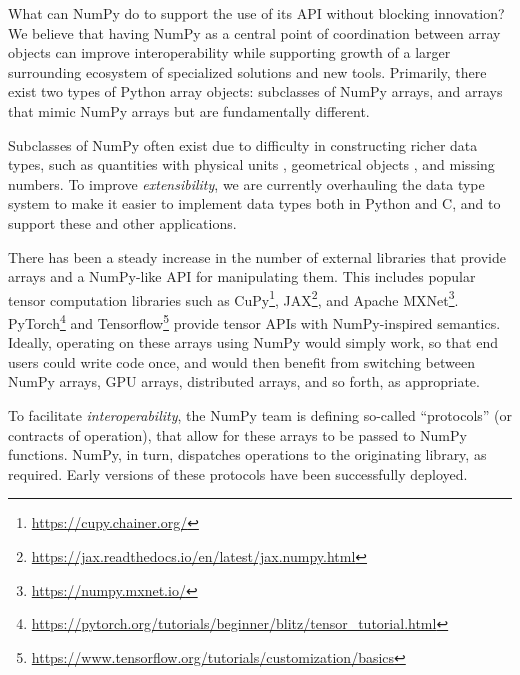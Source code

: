 What can NumPy do to support the use of its API without blocking innovation?
We believe that having NumPy as a central point of coordination between array objects can improve interoperability while
supporting growth of a larger surrounding ecosystem of specialized solutions
and new tools.
Primarily, there exist two types of Python array objects: subclasses of NumPy
arrays, and arrays that mimic NumPy arrays but are fundamentally different.

Subclasses of NumPy often exist due to difficulty in constructing richer data
types, such as quantities with physical units \cite{astropy,Goldbaum2018,pint},
geometrical objects \cite{pygeos}, and missing numbers.
To improve \emph{extensibility}, we are currently overhauling the data type
system to make it easier to implement data types both in Python and C, and to
support these and other applications.

There has been a steady increase in the number of external libraries that
provide arrays and a NumPy-like API for manipulating them.
This includes popular tensor computation libraries such as
CuPy\footnote{\url{https://cupy.chainer.org/}},
JAX\footnote{\url{https://jax.readthedocs.io/en/latest/jax.numpy.html}}, and
Apache MXNet\footnote{\url{https://numpy.mxnet.io/}}.
PyTorch\footnote{\url{https://pytorch.org/tutorials/beginner/blitz/tensor\_tutorial.html}}
and
Tensorflow\footnote{\url{https://www.tensorflow.org/tutorials/customization/basics}}
provide tensor APIs with NumPy-inspired semantics.
Ideally, operating on these arrays using NumPy would simply work, so that end
users could write code once, and would then benefit from switching between
NumPy arrays, GPU arrays, distributed arrays, and so forth, as appropriate.

To facilitate \emph{interoperability}, the NumPy team is defining so-called
``protocols'' (or contracts of operation), that allow for these arrays to be
passed to NumPy functions.
NumPy, in turn, dispatches operations to the originating library, as required.
Early versions of these protocols have been successfully deployed.



